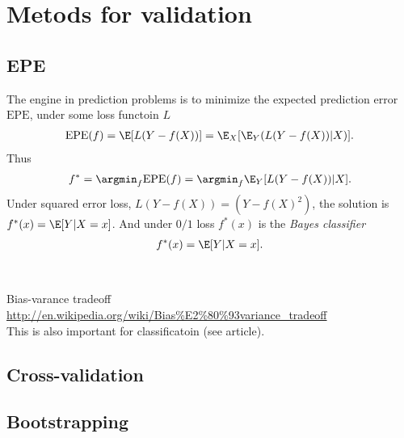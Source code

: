 \section{Metods for validation}
\label{sec:Metods for validation}
\subsection{EPE}
\label{sub:EPE}
The engine in prediction problems is to minimize the expected prediction error $\mathrm{EPE}$, under some loss functoin $L$
\begin{align}
  \mathrm{EPE}(f) = \E[L(Y-f(X))] = \E_X [\E_Y (L(Y-f(X))|X)].
\end{align}
Thus 
\begin{align}
  f^* = \argmin_f \mathrm{EPE}(f) = \argmin_f \E_Y [L(Y-f(X)) | X ].
\end{align}
Under squared error loss, $L(Y-f(X)) = (Y-f(X)^2)$, the solution is 
$f^*(x) = \E[Y | X=x]$. And under $0/1$ loss $f^*(x)$ is the \textit{Bayes classifier} 
\begin{align}
  f^*(x) = \E[Y | X=x].
\end{align}
\\
\\Bias-varance tradeoff \url{http://en.wikipedia.org/wiki/Bias%E2%80%93variance_tradeoff} \\
This is also important for classificatoin (see article).

\subsection{Cross-validation}
\label{sub:Cross-validation}

\subsection{Bootstrapping}
\label{sub:Bootstrapping}

